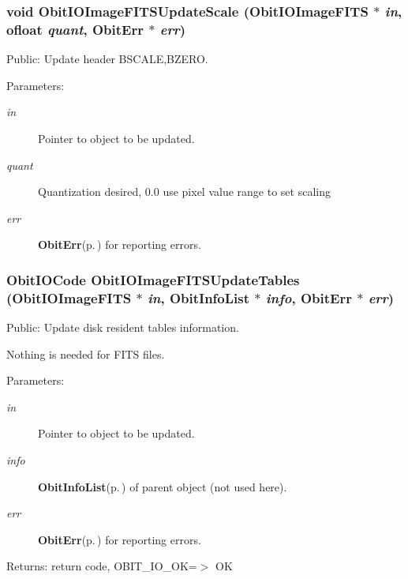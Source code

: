 \subsubsection{\setlength{\rightskip}{0pt plus 5cm}void Obit\-IOImage\-FITSUpdate\-Scale ({\bf Obit\-IOImage\-FITS} $\ast$ {\em in}, {\bf ofloat} {\em quant}, {\bf Obit\-Err} $\ast$ {\em err})}\label{ObitIOImageFITS_8h_a22}


Public: Update header BSCALE,BZERO. 

\begin{Desc}
\item[Parameters:]
\begin{description}
\item[{\em in}]Pointer to object to be updated. \item[{\em quant}]Quantization desired, 0.0 use pixel value range to set scaling \item[{\em err}]{\bf Obit\-Err}{\rm (p.\,\pageref{structObitErr})} for reporting errors. \end{description}
\end{Desc}
\subsubsection{\setlength{\rightskip}{0pt plus 5cm}Obit\-IOCode Obit\-IOImage\-FITSUpdate\-Tables ({\bf Obit\-IOImage\-FITS} $\ast$ {\em in}, {\bf Obit\-Info\-List} $\ast$ {\em info}, {\bf Obit\-Err} $\ast$ {\em err})}\label{ObitIOImageFITS_8h_a21}


Public: Update disk resident tables information. 

Nothing is needed for FITS files. \begin{Desc}
\item[Parameters:]
\begin{description}
\item[{\em in}]Pointer to object to be updated. \item[{\em info}]{\bf Obit\-Info\-List}{\rm (p.\,\pageref{structObitInfoList})} of parent object (not used here). \item[{\em err}]{\bf Obit\-Err}{\rm (p.\,\pageref{structObitErr})} for reporting errors. \end{description}
\end{Desc}
\begin{Desc}
\item[Returns:]return code, OBIT\_\-IO\_\-OK=$>$ OK \end{Desc}

